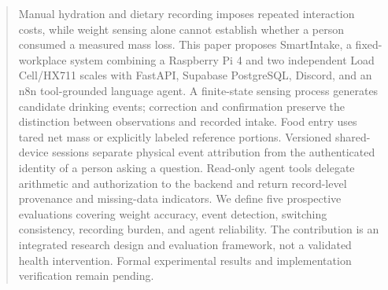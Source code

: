 \begin{abstract}
Manual hydration and dietary recording imposes repeated interaction costs, while weight sensing alone cannot establish whether a person consumed a measured mass loss. This paper proposes SmartIntake, a fixed-workplace system combining a Raspberry Pi 4 and two independent Load Cell/HX711 scales with FastAPI, Supabase PostgreSQL, Discord, and an n8n tool-grounded language agent. A finite-state sensing process generates candidate drinking events; correction and confirmation preserve the distinction between observations and recorded intake. Food entry uses tared net mass or explicitly labeled reference portions. Versioned shared-device sessions separate physical event attribution from the authenticated identity of a person asking a question. Read-only agent tools delegate arithmetic and authorization to the backend and return record-level provenance and missing-data indicators. We define five prospective evaluations covering weight accuracy, event detection, switching consistency, recording burden, and agent reliability. The contribution is an integrated research design and evaluation framework, not a validated health intervention. Formal experimental results and implementation verification remain pending.
\end{abstract}
